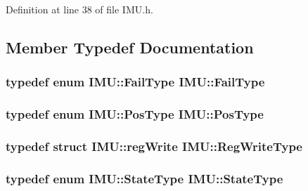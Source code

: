 Definition at line 38 of file IMU.h.



\subsection{Member Typedef Documentation}
\hypertarget{class_i_m_u_a4baf4d6e504dcb71c4afab34be225620}{
\subsubsection[{FailType}]{\setlength{\rightskip}{0pt plus 5cm}typedef enum {\bf IMU::FailType}  {\bf IMU::FailType}}}
\label{class_i_m_u_a4baf4d6e504dcb71c4afab34be225620}
\hypertarget{class_i_m_u_ad82ee88c050235081f004f81a5724e09}{
\subsubsection[{PosType}]{\setlength{\rightskip}{0pt plus 5cm}typedef enum {\bf IMU::PosType}  {\bf IMU::PosType}}}
\label{class_i_m_u_ad82ee88c050235081f004f81a5724e09}
\hypertarget{class_i_m_u_a1960eeaec92b6b60d4f6c9e28b042b80}{
\subsubsection[{RegWriteType}]{\setlength{\rightskip}{0pt plus 5cm}typedef struct {\bf IMU::regWrite}  {\bf IMU::RegWriteType}}}
\label{class_i_m_u_a1960eeaec92b6b60d4f6c9e28b042b80}
\hypertarget{class_i_m_u_a2c1f560a0bc80d0bd06bb56a614aeedd}{
\subsubsection[{StateType}]{\setlength{\rightskip}{0pt plus 5cm}typedef enum {\bf IMU::StateType}  {\bf IMU::StateType}}}
\label{class_i_m_u_a2c1f560a0bc80d0bd06bb56a614aeedd}


